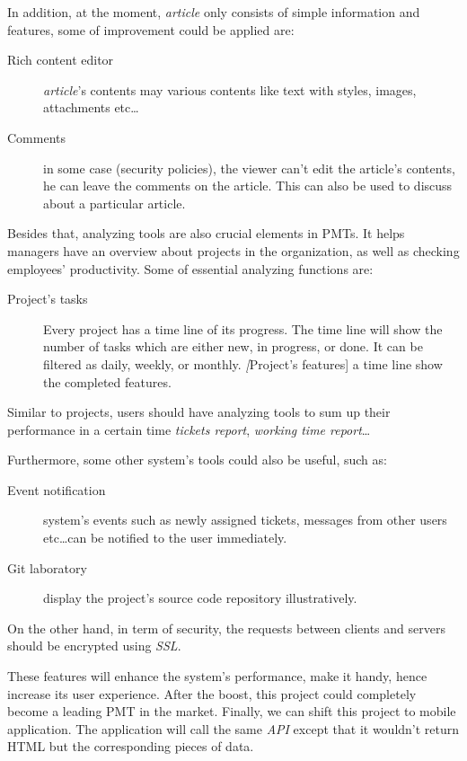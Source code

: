 In addition, at the moment, \emph{article} only consists of simple information and features, some of improvement could be applied are:
\begin{description}
\item[Rich content editor] \emph{article}'s contents may various contents like text with styles, images, attachments etc\dots
\item[Comments] in some case (\eg security policies), the viewer can't edit the article's contents, he can leave the comments on the article.
This can also be used to discuss about a particular article.
\end{description}

Besides that, analyzing tools are also crucial elements in PMTs.
It helps managers have an overview about projects in the organization, as well as checking employees' productivity.
Some of essential analyzing functions are:
\begin{description}
\item[Project's tasks] Every project has a time line of its progress.
The time line will show the number of tasks which are either new, in progress, or done.
It can be filtered as daily, weekly, or monthly.
\emph[Project's features] a time line show the completed features.
\end{description}
Similar to projects, users should have analyzing tools to sum up their performance in a certain time \eg \emph{tickets report}, \emph{working time report}\dots

Furthermore, some other system's tools could also be useful, such as:
\begin{description}
\item[Event notification] system's events such as newly assigned tickets, messages from other users etc\dots can be notified to the user immediately.
\item[Git laboratory] display the project's source code repository illustratively.
\end{description}

On the other hand, in term of security, the requests between clients and servers should be encrypted using \emph{SSL}.

These features will enhance the system's performance, make it handy, hence increase its user experience.
After the boost, this project could completely become a leading PMT in the market.
Finally, we can shift this project to mobile application. 
The application will call the same \emph{API} except that it wouldn't return HTML but the corresponding pieces of data.

